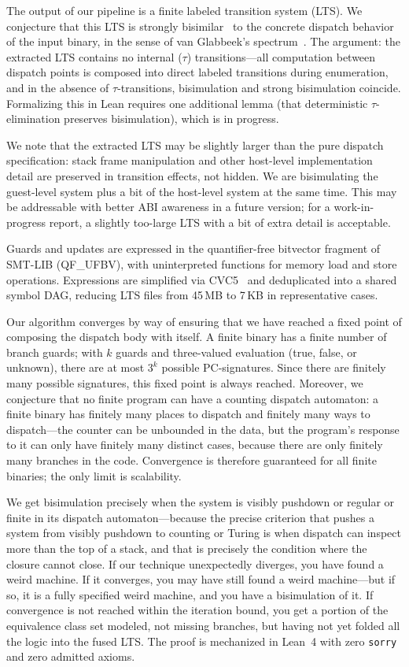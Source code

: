 \documentclass[conference]{./template/IEEEtran}
\begin{document}
The output of our pipeline is a finite labeled transition system (LTS). We conjecture that this LTS is strongly bisimilar~\cite{milner1989communication} to the concrete dispatch behavior of the input binary, in the sense of van Glabbeek's spectrum~\cite{vanglabbeek1990ltbt}. The argument: the extracted LTS contains no internal ($\tau$) transitions---all computation between dispatch points is composed into direct labeled transitions during enumeration, and in the absence of $\tau$-transitions, bisimulation and strong bisimulation coincide. Formalizing this in Lean requires one additional lemma (that deterministic $\tau$-elimination preserves bisimulation), which is in progress.

We note that the extracted LTS may be slightly larger than the pure dispatch specification: stack frame manipulation and other host-level implementation detail are preserved in transition effects, not hidden. We are bisimulating the guest-level system plus a bit of the host-level system at the same time. This may be addressable with better ABI awareness in a future version; for a work-in-progress report, a slightly too-large LTS with a bit of extra detail is acceptable.

Guards and updates are expressed in the quantifier-free bitvector fragment of SMT-LIB (QF\_UFBV), with uninterpreted functions for memory load and store operations. Expressions are simplified via CVC5~\cite{barbosa2022cvc5} and deduplicated into a shared symbol DAG, reducing LTS files from 45\,MB to 7\,KB in representative cases.

Our algorithm converges by way of ensuring that we have reached a fixed point of composing the dispatch body with itself. A finite binary has a finite number of branch guards; with $k$ guards and three-valued evaluation (true, false, or unknown), there are at most $3^k$ possible PC-signatures. Since there are finitely many possible signatures, this fixed point is always reached. Moreover, we conjecture that no finite program can have a counting dispatch automaton: a finite binary has finitely many places to dispatch and finitely many ways to dispatch---the counter can be unbounded in the data, but the program's response to it can only have finitely many distinct cases, because there are only finitely many branches in the code. Convergence is therefore guaranteed for all finite binaries; the only limit is scalability.

We get bisimulation precisely when the system is visibly pushdown or regular or finite in its dispatch automaton---because the precise criterion that pushes a system from visibly pushdown to counting or Turing is when dispatch can inspect more than the top of a stack, and that is precisely the condition where the closure cannot close. If our technique unexpectedly diverges, you have found a weird machine. If it converges, you may have still found a weird machine---but if so, it is a fully specified weird machine, and you have a bisimulation of it. If convergence is not reached within the iteration bound, you get a portion of the equivalence class set modeled, not missing branches, but having not yet folded all the logic into the fused LTS. The proof is mechanized in Lean~4 with zero \texttt{sorry} and zero admitted axioms.
\end{document}
